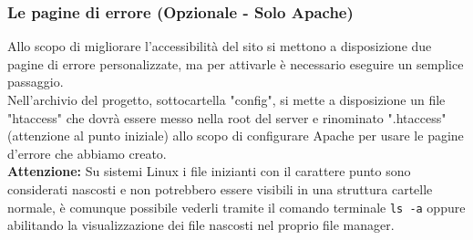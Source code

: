 \subsubsection{Le pagine di errore (Opzionale - Solo Apache)}
Allo scopo di migliorare l'accessibilità del sito si mettono a disposizione due pagine di errore personalizzate, ma per attivarle è necessario eseguire un semplice passaggio.\\
Nell'archivio del progetto, sottocartella "config", si mette a disposizione un file "htaccess" che dovrà essere messo nella root del server e rinominato ".htaccess" (attenzione al punto iniziale) allo scopo di configurare Apache per usare le pagine d'errore che abbiamo creato.\\
\textbf{Attenzione:} Su sistemi Linux i file inizianti con il carattere punto sono considerati nascosti e non potrebbero essere visibili in una struttura cartelle normale, è comunque possibile vederli tramite il comando terminale \texttt{ls -a} oppure abilitando la visualizzazione dei file nascosti nel proprio file manager.
